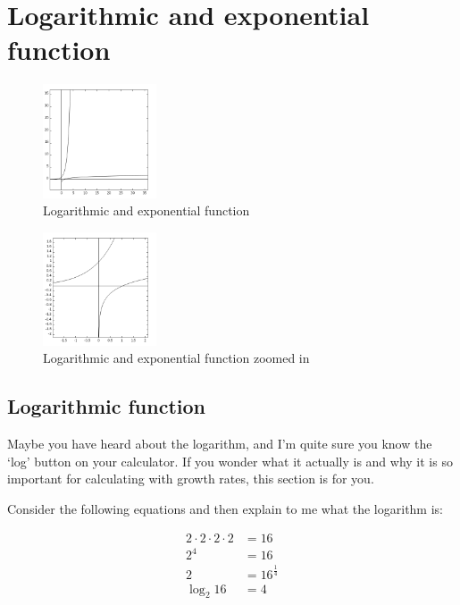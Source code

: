 \documentclass[
  12pt,
  oneside]{book}
\theoremstyle{definition}
\theoremstyle{definition}
\theoremstyle{definition}
\theoremstyle{definition}
\theoremstyle{remark}
\begin{document}
\hypertarget{logarithmic-and-exponential-function}{%
\section{Logarithmic and exponential function}\label{logarithmic-and-exponential-function}}

\begin{figure}
\centering
\includegraphics[width=0.3\textwidth,height=\textheight]{fig/logexp1.png}
\caption{\label{fig:logexp1} Logarithmic and exponential function}
\end{figure}

\begin{figure}
\centering
\includegraphics[width=0.3\textwidth,height=\textheight]{fig/logexp2.png}
\caption{\label{fig:logexp2} Logarithmic and exponential function zoomed in}
\end{figure}

\hypertarget{logarithmic-function}{%
\subsection{Logarithmic function}\label{logarithmic-function}}

Maybe you have heard about the logarithm, and I'm quite sure you know the `log' button on your calculator. If you wonder what it actually is and why it is so important for calculating with growth rates, this section is for you.

Consider the following equations and then explain to me what the logarithm is:

\begin{align*}
2\cdot2\cdot2\cdot2 &= 16 \\
2^4 &= 16 \\
2 &= 16^{\frac{1}{4}} \\
\log_2 16 &= 4 
\end{align*}
\end{document}
